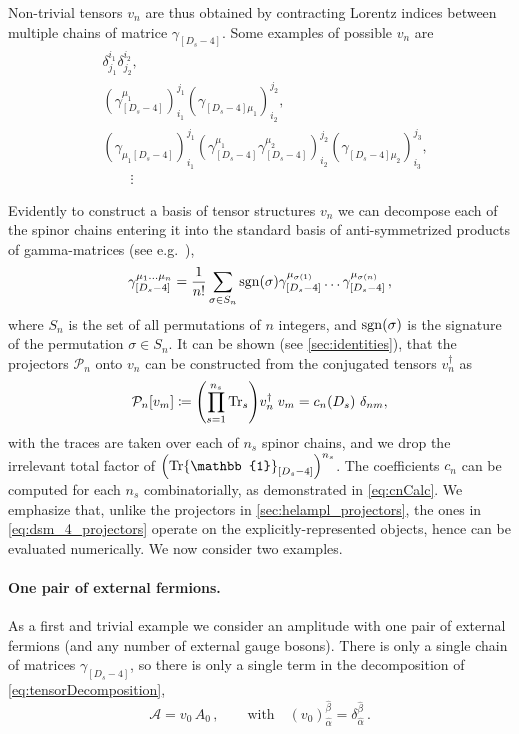 Non-trivial tensors $v_n$ are thus obtained by contracting
Lorentz indices between multiple chains of  matrice $\gamma_{[D_s-4]}$.
Some examples of possible $v_n$ are
\begin{equation}
  \begin{aligned}
    & \delta^{i_1}_{j_1} \delta^{i_2}_{j_2},\\
    & (\gamma_{[D_s-4]}^{\mu_1} )_{i_1}^{j_1} (\gamma_{[D_s-4]\mu_1}^{\phantom{\mu}})_{i_2}^{j_2}, \\
    & (\gamma_{\mu_1[D_s-4]}^{\phantom{\mu}} )_{i_1}^{j_1} (\gamma_{[D_s-4]}^{\mu_1}\gamma_{[D_s-4]}^{\mu_2} )_{i_2}^{j_2} (\gamma_{[D_s-4]\mu_2}^{\phantom{\mu}})_{i_3}^{j_3},\\
    & \qquad \vdots{}
  \end{aligned}
\end{equation}

Evidently to construct a basis of tensor structures $v_n$ we can decompose each of the spinor chains entering it
into the standard basis of anti-symmetrized products of gamma-matrices (see e.g.\ \cite{Veltman:1988au}),
\begin{align}\label{eq:basisGammaChainDs}
\gamma_{[D_s-4]}^{\mu_1 \ldots \mu_n} = \frac{1}{n!} \sum_{ \sigma\in S_n} \operatorname{sgn}(\sigma) \gamma_{[D_s-4]}^{\mu_{\sigma(1)}} \ldots \gamma_{[D_s-4]}^{\mu_{\sigma(n)}}\,,
\end{align}
where $S_n$ is the set of all permutations of $n$ integers, and $\operatorname{sgn}(\sigma)$ is the signature of the permutation $\sigma\in S_n$.
It can be shown (see \cref{sec:identities}), that the
projectors $\mathcal{P}_n$ onto $v_n$ can be constructed from the conjugated tensors $v_n^\dagger$ as
\begin{align} \label{eq:dsm_4_projectors}
  \mathcal{P}_n [v_m] \coloneqq \qty(\prod_{s=1}^{n_s} \Tr_s) v_n^\dagger\; v_m = c_n(D_s)~\delta_{n m},  %
\end{align}
with the traces are taken over each of $n_s$ spinor chains, and we drop the irrelevant total factor of $\qty(\Tr\mathbb{1}_{[D_s -4 ]})^{n_s}$.
The coefficients $c_n$ can be computed for each $n_s$ combinatorially, as demonstrated in \cref{eq:cnCalc}.
We emphasize that, unlike the projectors in \cref{sec:helampl_projectors}, the ones in \cref{eq:dsm_4_projectors}
operate on the explicitly-represented objects, hence can be evaluated numerically.
We now consider two examples.

\paragraph{One pair of external fermions.}
As a first and trivial example we consider an amplitude with one pair of external fermions (and any number of external gauge bosons). 
There is only a single chain of matrices $\gamma_{[D_s-4]}$, so
there is only a single term in the decomposition of \cref{eq:tensorDecomposition},
\begin{equation}\label{eq:decompqqbar}
  \mathcal{A} =v_0\,A_0\,,\qquad \textrm{with}\quad (v_0)_{\hat{\alpha}}^{\hat{\beta}}=\delta_{\hat{\alpha}}^{\hat{\beta}}\,.
\end{equation}
